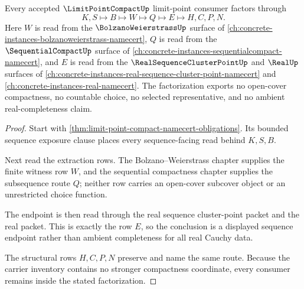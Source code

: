 \begin{theorem}\label{thm:limit-point-compact-bolzano-weierstrass-factorization}
Every accepted $\LimitPointCompactUp$ limit-point consumer factors through
$$
K,S \longmapsto B \longmapsto W \longmapsto Q \longmapsto E \longmapsto H,C,P,N.
$$
Here $W$ is read from the $\BolzanoWeierstrassUp$ surface of \autoref{ch:concrete-instances-bolzanoweierstrass-namecert}, $Q$ is read from the $\SequentialCompactUp$ surface of \autoref{ch:concrete-instances-sequentialcompact-namecert}, and $E$ is read from the $\RealSequenceClusterPointUp$ and $\RealUp$ surfaces of \autoref{ch:concrete-instances-real-sequence-cluster-point-namecert} and \autoref{ch:concrete-instances-real-namecert}. The factorization exports no open-cover compactness, no countable choice, no selected representative, and no ambient real-completeness claim.
\end{theorem}
\begin{proof}
Start with \autoref{thm:limit-point-compact-namecert-obligations}. Its bounded sequence exposure clause places every sequence-facing read behind $K,S,B$.

Next read the extraction rows. The Bolzano--Weierstrass chapter supplies the finite witness row $W$, and the sequential compactness chapter supplies the subsequence route $Q$; neither row carries an open-cover subcover object or an unrestricted choice function.

The endpoint is then read through the real sequence cluster-point packet and the real packet. This is exactly the row $E$, so the conclusion is a displayed sequence endpoint rather than ambient completeness for all real Cauchy data.

The structural rows $H,C,P,N$ preserve and name the same route. Because the carrier inventory contains no stronger compactness coordinate, every consumer remains inside the stated factorization.
\end{proof}


